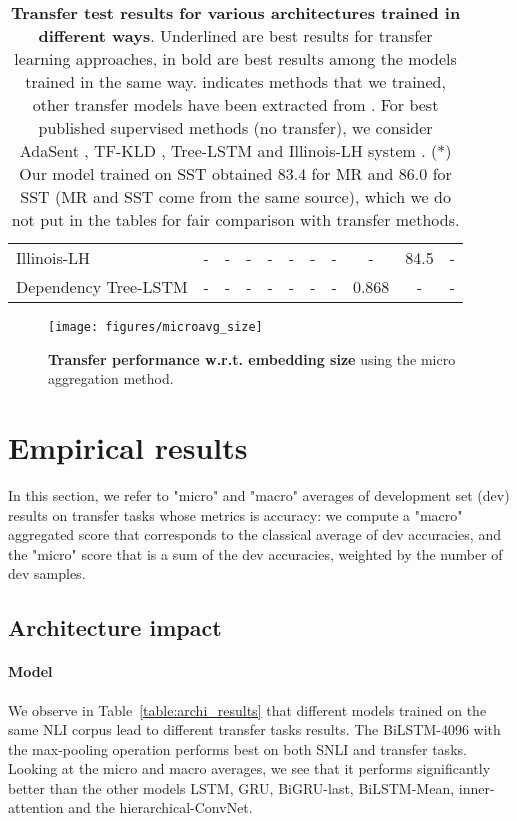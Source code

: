\documentclass[11pt,letterpaper]{article}
\begin{document}
\begin{table*}[h!]
{\begin{tabular}{@{}l@{\,}|cccc@{\,\,}c@{\,\,}ccccc@{}}
Illinois-LH  &  - & - & - & - & - & - & - & - & 84.5 & - \\
Dependency Tree-LSTM  &  - & - & - & - & - & - & - & 0.868 & - & - \\
\hline
\end{tabular}
}
\caption{{\bf Transfer test results for various architectures trained in different ways}. Underlined are best results for transfer learning approaches, in bold are best results among the models trained in the same way.  indicates methods that we trained, other transfer models have been extracted from \cite{hill2016learning}. For best published supervised methods (no transfer), we consider AdaSent \cite{zhao2015self}, TF-KLD \cite{ji2013discriminative}, Tree-LSTM \cite{tai2015improved} and Illinois-LH system \cite{lai2014illinois}. (*) Our model trained on SST obtained 83.4 for MR and 86.0 for SST (MR and SST come from the same source), which we do not put in the tables for fair comparison with transfer methods.
\label{table:tasks_results}
}
\end{table*}

\begin{figure}[h!]
  \centering
  \texttt{[image: figures/microavg\_size]}
    \caption{{\bf Transfer performance w.r.t. embedding size} using the micro aggregation method.
    \label{fig:embed_results}}
\end{figure}

\section{Empirical results}
In this section, we refer to "micro" and "macro" averages of development set (dev) results on transfer tasks whose metrics is accuracy: we compute a "macro" aggregated score that corresponds to the classical average of dev accuracies, and the "micro" score that is a sum of the dev accuracies, weighted by the number of dev samples.

\subsection{Architecture impact}

\paragraph{Model}
We observe in Table~\ref{table:archi_results} that different models trained on the same NLI corpus lead to different transfer tasks results. The BiLSTM-4096 with the max-pooling operation performs best on both SNLI and transfer tasks. Looking at the micro and macro averages, we see that it performs significantly better than the other models LSTM, GRU, BiGRU-last, BiLSTM-Mean, inner-attention and the hierarchical-ConvNet.
\end{document}
